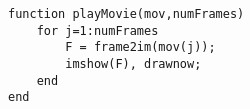 \begin{verbatim}
function playMovie(mov,numFrames)
    for j=1:numFrames
        F = frame2im(mov(j));
        imshow(F), drawnow;
    end	
end
\end{verbatim}